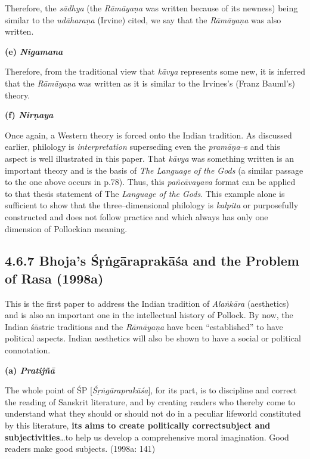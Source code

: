Therefore, the \textit{sādhya} (the \textit{Rāmāyaṇa} was written because of its newness) being similar to the \textit{udāharaṇa} (Irvine) cited, we say that the \textit{Rāmāyaṇa} was also written.

\textbf{(e) \textit{Nigamana}}

Therefore, from the traditional view that \textit{kāvya} represents some new, it is inferred that the \textit{Rāmāyaṇa }was written as it is similar to the Irvines’s (Franz Bauml’s) theory.

\textbf{(f) \textit{Nirṇaya}}

Once again, a Western theory is forced onto the Indian tradition. As discussed earlier, philology is \textit{interpretation} superseding even the \textit{pramāṇa}–s and this aspect is well illustrated in this paper. That \textit{kāvya} was something written is an important theory and is the basis of \textit{The Language of the Gods} (a similar passage to the one above occurs in p.78). Thus, this \textit{pañcāvayava} format can be applied to that thesis statement of The\textit{ Language of the Gods}. This example alone is sufficient to show that the three–dimensional philology is \textit{kalpita} or purposefully constructed and does not follow practice and which always has only one dimension of Pollockian meaning.


\subsection*{4.6.7 Bhoja's Śṛṅgāraprakāśa and the Problem of Rasa (1998a)}

This is the first paper to address the Indian tradition of \textit{Alaṅkāra }(aesthetics) and is also an important one in the intellectual history of Pollock. By now, the Indian śāstric traditions and the \textit{Rāmāyaṇa} have been “established” to have political aspects. Indian aesthetics will also be shown to have a social or political connotation.

\textbf{(a) \textit{Pratijñā}}

\begin{myquote}
The whole point of ŚP [\textit{Śṛṅgāraprakāśa}], for its part, is to discipline and correct the reading of Sanskrit literature, and by creating readers who thereby come to understand what they should or should not do in a peculiar lifeworld constituted by this literature, \textbf{its aims to create politically correct}\textbf{subject and subjectivities}…to help us develop a comprehensive moral imagination. Good readers make good subjects. (1998a: 141)
\end{myquote}


